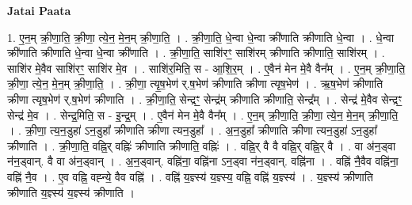 \documentclass[17pt]{extarticle}
\begin{document}
\textbf{Jatai Paata} \newline

1. ए॒न॒म् क्री॒णा॒ति॒ क्री॒णा॒ त्ये॒न॒ मे॒न॒म् क्री॒णा॒ति॒ । . क्री॒णा॒ति॒ धे॒न्वा धे॒न्वा क्री॑णाति क्रीणाति धे॒न्वा । . धे॒न्वा क्री॑णाति क्रीणाति धे॒न्वा धे॒न्वा क्री॑णाति । . क्री॒णा॒ति॒ साशि॑रꣳ॒॒ साशि॑रम् क्रीणाति क्रीणाति॒ साशि॑रम् । . साशि॑र मे॒वैव साशि॑रꣳ॒॒ साशि॑र मे॒व । . साशि॑र॒मिति॒ स - आ॒शि॒र॒म् । . ए॒वैन॑ मेन मे॒वै वैन᳚म् । . ए॒न॒म् क्री॒णा॒ति॒ क्री॒णा॒ त्ये॒न॒ मे॒न॒म् क्री॒णा॒ति॒ । . क्री॒णा॒ त्यृ॒ष॒भेण॑ र्.ष॒भेण॑ क्रीणाति क्रीणा त्यृष॒भेण॑ । . ऋ॒ष॒भेण॑ क्रीणाति क्रीणा त्यृष॒भेण॑ र्.ष॒भेण॑ क्रीणाति । . क्री॒णा॒ति॒ सेन्द्रꣳ॒॒ सेन्द्र॑म् क्रीणाति क्रीणाति॒ सेन्द्र᳚म् । . सेन्द्र॑ मे॒वैव सेन्द्रꣳ॒॒ सेन्द्र॑ मे॒व । . सेन्द्र॒मिति॒ स - इ॒न्द्र॒म् । . ए॒वैन॑ मेन मे॒वै वैन᳚म् । . ए॒न॒म् क्री॒णा॒ति॒ क्री॒णा॒ त्ये॒न॒ मे॒न॒म् क्री॒णा॒ति॒ । . क्री॒णा॒ त्य॒न॒डुहा॑ ऽन॒डुहा᳚ क्रीणाति क्रीणा त्यन॒डुहा᳚ । . अ॒न॒डुहा᳚ क्रीणाति क्रीणा त्यन॒डुहा॑ ऽन॒डुहा᳚ क्रीणाति । . क्री॒णा॒ति॒ वह्नि॒र् वह्निः॑ क्रीणाति क्रीणाति॒ वह्निः॑ । . वह्नि॒र् वै वै वह्नि॒र् वह्नि॒र् वै । . वा अ॑न॒ड्वा न॑न॒ड्वान्. वै वा अ॑न॒ड्वान् । . अ॒न॒ड्वान्. वह्नि॑ना॒ वह्नि॑ना ऽन॒ड्वा न॑न॒ड्वान्. वह्नि॑ना । . वह्नि॑ नै॒वैव वह्नि॑ना॒ वह्नि॑ नै॒व । . ए॒व वह्नि॒ वह्न्ये॒ वैव वह्नि॑ । . वह्नि॑ य॒ज्ञ्स्य॑ य॒ज्ञ्स्य॒ वह्नि॒ वह्नि॑ य॒ज्ञ्स्य॑ । . य॒ज्ञ्स्य॑ क्रीणाति क्रीणाति य॒ज्ञ्स्य॑ य॒ज्ञ्स्य॑ क्रीणाति । \newline
\end{document}
